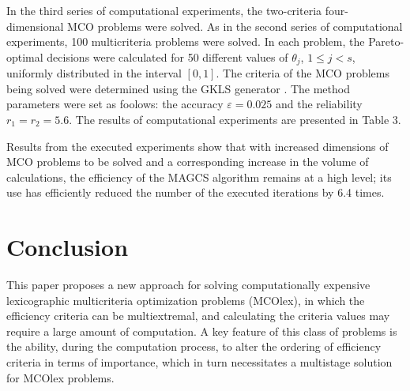 \documentclass[smallextended]{svjour3}       %
\begin{document}
In the third series of computational experiments, the two-criteria four-dimensional MCO problems were solved. As in the second series of computational experiments, 100 multicriteria problems were solved. In each problem, the Pareto-optimal decisions were calculated for 50 different values of $\theta_j$, $1 \leq j <s$, uniformly distributed in the interval $[0,1]$. The criteria of the MCO problems being solved were determined using the GKLS generator \cite{c37}. The method parameters were set as foolows: the accuracy $\varepsilon = 0.025$ and the reliability $r_1=r_2=5.6$. The results of computational experiments are presented in Table 3.


\begin{table}[ht]
\centering
\caption{Results of the series of experiments to solve two-criteria four-dimensional MCO}
\label{tab:3}
\end{table}


Results from the executed experiments show that with increased dimensions of MCO problems to be solved and a corresponding increase in the volume of calculations, the efficiency of the MAGCS algorithm remains at a high level;  its use has efficiently reduced the number of the executed iterations by 6.4 times.



\section{Conclusion}
\label{sec:5}

This paper proposes a new approach for solving computationally expensive lexicographic multicriteria optimization problems (MCOlex), in which the efficiency criteria can be multiextremal, and calculating the criteria values may require a large amount of computation. A key feature of this class of problems is the ability, during the computation process, to alter the ordering of efficiency criteria in terms of importance, which in turn necessitates a multistage solution for MCOlex problems.
\end{document}
